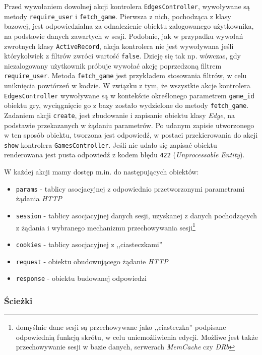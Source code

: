 \documentclass[a4paper,12pt]{article}
\begin{document}
Przed wywołaniem dowolnej akcji kontrolera \texttt{EdgesController},
wywoływane są metody \texttt{require\_user} i
\texttt{fetch\_game}. Pierwsza z nich, pochodząca z klasy bazowej,
jest odpowiedzialna za odnalezienie obiektu zalogowanego użytkownika,
na podstawie danych zawartych w sesji. Podobnie, jak w przypadku
wywołań zwrotnych klasy \texttt{ActiveRecord}, akcja kontrolera nie
jest wywoływana jeśli którykolwiek z filtrów zwróci wartość
\texttt{false}. Dzieję się tak np. wówczas, gdy niezalogowany
użytkownik próbuje wywołać akcję poprzedzoną filtrem
\texttt{require\_user}. Metoda \texttt{fetch\_game} jest przykładem
stosowania filtrów, w celu uniknięcia powtórzeń w kodzie. W związku z
tym, że wszystkie akcje kontrolera \texttt{EdgesController} wywoływane
są w kontekście określonego parametrem \texttt{game\_id} obiektu gry,
wyciągnięcie go z bazy zostało wydzielone do metody
\texttt{fetch\_game}. Zadaniem akcji \texttt{create}, jest zbudowanie
i zapisanie obiektu klasy \emph{Edge}, na podstawie przekazanych w
żądaniu parametrów. Po udanym zapisie utworzonego w ten sposób
obiektu, tworzona jest odpowiedź, w postaci przekierowania do akcji
\texttt{show} kontrolera \texttt{GamesController}. Jeśli nie udało się
zapisać obiektu renderowana jest pusta odpowiedź z kodem błędu
\texttt{422} (\emph{Unprocessable Entity}).

W każdej akcji mamy dostęp m.in. do następujących obiektów:

\begin{itemize}
\item \texttt{params} - tablicy asocjacyjnej z odpowiednio
  przetworzonymi parametrami żądania \emph{HTTP}
\item \texttt{session} - tablicy asocjacyjnej danych sesji, uzyskanej
  z danych pochodzących z żądania i wybranego mechanizmu
  przechowywania sesji\footnote{domyślnie dane sesji są przechowywane
    jako ,,ciasteczka'' podpisane odpowiednią funkcją skrótu, w celu
    uniemożliwienia edycji. Możliwe jest także przechowywanie sesji w
    bazie danych, serwerach \emph{MemCache} czy \emph{DRb}}
\item \texttt{cookies} - tablicy asocjacyjnej z ,,ciasteczkami''
\item \texttt{request} - obiektu obudowującego żądanie \emph{HTTP}
\item \texttt{response} - obiektu budowanej odpowiedzi
\end{itemize}

\subsubsection{Ścieżki}
\end{document}
